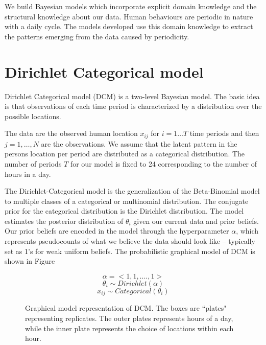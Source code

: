 \documentclass[12pt,parskip=half, DIV=calc, BCOR=10mm, x11names]{scrbook}
\begin{document}
We build Bayesian models which incorporate explicit domain knowledge and the structural knowledge about our data. Human behaviours are periodic in nature with a daily cycle. The models developed use this domain knowledge to extract the patterns emerging from the data caused by periodicity.

\section{Dirichlet Categorical model }

Dirichlet Categorical model (DCM) is a two-level Bayesian model. The basic idea is that observations of each time period is characterized by a distribution over the possible locations.

The data are the observed human location $x_{ij}$ for $i = 1 \dots T$ time periods and then $j = 1, \dots , N$  are the observations.  We assume that the latent pattern in the persons location per period are distributed as a categorical distribution. The number of periods $T$ for our model is fixed to 24 corresponding to the number of hours in a day. 

The Dirichlet-Categorical model is the generalization of the Beta-Binomial model to multiple classes of a categorical or multinomial distribution. The conjugate prior for the categorical distribution is the Dirichlet distribution. The model estimates the posterior distribution of $\theta_i$ given our current data and prior beliefs. Our prior beliefs are encoded in the model through the hyperparameter $\alpha$, which represents pseudocounts of what we believe the data should look like – typically set as 1's for weak uniform beliefs. The probabilistic graphical model of  DCM is shown in Figure \cite{dcm}

\noindent
\begin{figure}[htp]

\begin{minipage}{0.3\textwidth}
\centering


\end{minipage}%
\begin{minipage}{0.7\textwidth}

\begin{equation*}
	\alpha = <1, 1, .... , 1 > 
\end{equation*}
\begin{equation*}
	\theta_i  \sim Dirichlet(\alpha)
\end{equation*}
\begin{equation*}
	x_{ij} \sim Categorical(\theta_i)
\end{equation*}
\end{minipage}
\caption{Graphical model representation of DCM. The boxes are ``plates" representing replicates. The outer plates represents hours of a day, while the inner plate represents the choice of locations within each hour.}
\label{dcm}
\end{figure}
\end{document}
